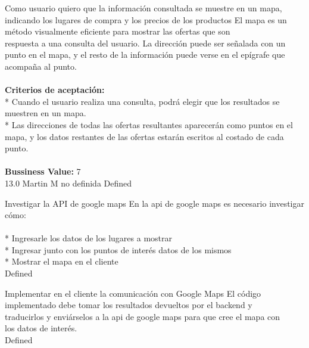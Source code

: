 	{Como usuario quiero que la información consultada se muestre en un mapa, indicando los lugares de compra y los precios de los productos} %
	{El mapa es un método visualmente eficiente para mostrar las ofertas que son\\
respuesta a una consulta del usuario. La dirección puede ser señalada con un\\
punto en el mapa, y el resto de la información puede verse en el epígrafe que\\
acompaña al punto.\\
  \\
\textbf{Criterios de aceptación:}\\
* Cuando el usuario realiza una consulta, podrá elegir que los resultados se muestren en un mapa.  \\
* Las direcciones de todas las ofertas resultantes aparecerán como puntos en el mapa, y los datos restantes de las ofertas estarán escritos al costado de cada punto. \\
  \\
\textbf{Bussiness Value:} 7\\
} %
	{} %
	{13.0} %
	{Martin M} %
	{no definida} %
	{Defined} %

		{Investigar la API de google maps} %
		{En la api de google maps es necesario investigar cómo:\\
  \\
* Ingresarle los datos de los lugares a mostrar\\
* Ingresar junto con los puntos de interés datos de los mismos\\
* Mostrar el mapa en el cliente\\
} %
		{} %
		{} %
		{} %
		{Defined} %

		{Implementar en el cliente la comunicación con Google Maps} %
		{El código implementado debe tomar los resultados devueltos por el backend y\\
traducirlos y enviárselos a la api de google maps para que cree el mapa con\\
los datos de interés.\\
} %
		{} %
		{} %
		{} %
		{Defined} %

